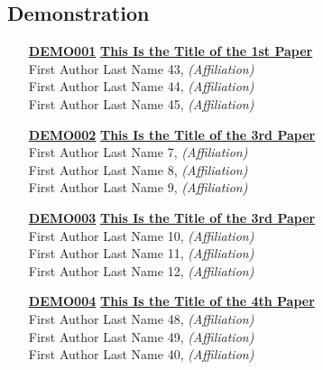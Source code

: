 \subsection{Demonstration}
\begin{enumerate}
\item[\href{https://doi.org/10.1145/1122445.1122456}{\textbf{DEMO001}}]
\href{https://doi.org/10.1145/1122445.1122456}{\textbf{This Is the Title of the 1st Paper}}\\
First Author Last Name 43, \emph{(Affiliation)}\\
First Author Last Name 44, \emph{(Affiliation)}\\
First Author Last Name 45, \emph{(Affiliation)}\\

\item[\href{https://doi.org/10.1145/1122445.1122456}{\textbf{DEMO002}}]
\href{https://doi.org/10.1145/1122445.1122456}{\textbf{This Is the Title of the 3rd Paper}}\\
First Author Last Name 7, \emph{(Affiliation)}\\
First Author Last Name 8, \emph{(Affiliation)}\\
First Author Last Name 9, \emph{(Affiliation)}\\

\item[\href{https://doi.org/10.1145/1122445.1122456}{\textbf{DEMO003}}]
\href{https://doi.org/10.1145/1122445.1122456}{\textbf{This Is the Title of the 3rd Paper}}\\
First Author Last Name 10, \emph{(Affiliation)}\\
First Author Last Name 11, \emph{(Affiliation)}\\
First Author Last Name 12, \emph{(Affiliation)}\\

\item[\href{https://doi.org/10.1145/1122445.1122456}{\textbf{DEMO004}}]
\href{https://doi.org/10.1145/1122445.1122456}{\textbf{This Is the Title of the 4th Paper}}\\
First Author Last Name 48, \emph{(Affiliation)}\\
First Author Last Name 49, \emph{(Affiliation)}\\
First Author Last Name 40, \emph{(Affiliation)}\\
\end{enumerate}


